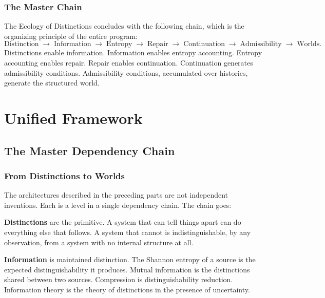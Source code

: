 \documentclass[12pt,a4paper]{book}
\theoremstyle{remark}
\theoremstyle{definition}
\begin{document}
\section{The Master Chain}

The Ecology of Distinctions concludes with the following chain, which
is the organizing principle of the entire program:
\begin{equation}
  \text{Distinction}
  \;\to\;
  \text{Information}
  \;\to\;
  \text{Entropy}
  \;\to\;
  \text{Repair}
  \;\to\;
  \text{Continuation}
  \;\to\;
  \text{Admissibility}
  \;\to\;
  \text{Worlds.}
\end{equation}
Distinctions enable information. Information enables entropy accounting.
Entropy accounting enables repair. Repair enables continuation. Continuation
generates admissibility conditions. Admissibility conditions, accumulated
over histories, generate the structured world.

\part{Unified Framework}

\chapter{The Master Dependency Chain}

\section{From Distinctions to Worlds}

The architectures described in the preceding parts are not independent
inventions. Each is a level in a single dependency chain. The chain
goes:

\medskip
\noindent
\textbf{Distinctions} are the primitive. A system that can tell things
apart can do everything else that follows. A system that cannot is
indistinguishable, by any observation, from a system with no internal
structure at all.

\medskip
\noindent
\textbf{Information} is maintained distinction. The Shannon entropy of
a source is the expected distinguishability it produces. Mutual information
is the distinctions shared between two sources. Compression is
distinguishability reduction. Information theory is the theory of
distinctions in the presence of uncertainty.
\end{document}
